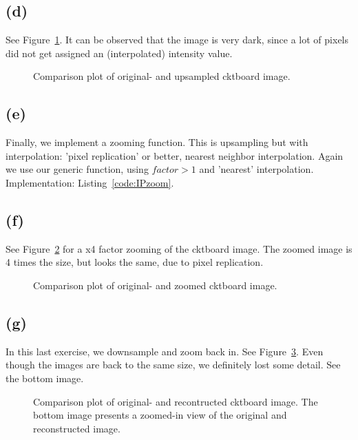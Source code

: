 \documentclass{article}
\begin{document}
\subsection*{(d)} See Figure~\ref{fig:upsampling}. It can be observed that the image is very dark, since a lot of pixels did not get assigned an (interpolated) intensity value.

\begin{figure}[ht]
    \centering
    
    \caption{Comparison plot of original- and upsampled cktboard image.}
    \label{fig:upsampling}
\end{figure}

\subsection*{(e)} Finally, we implement a zooming function. This is upsampling but with interpolation: 'pixel replication' or better, nearest neighbor interpolation. Again we use our generic function, using $factor > 1$ and 'nearest' interpolation.  Implementation: Listing~\ref{code:IPzoom}.

\subsection*{(f)} See Figure~\ref{fig:zoom} for a x4 factor zooming of the cktboard image. The zoomed image is 4 times the size, but looks the same, due to pixel replication.
\begin{figure}[ht]
    \centering
    
    \caption{Comparison plot of original- and zoomed cktboard image.}
    \label{fig:zoom}
\end{figure}

\subsection*{(g)} In this last exercise, we downsample and zoom back in. See Figure~\ref{fig:reconstruction}. Even though the images are back to the same size, we definitely lost some detail. See the bottom image.
\begin{figure}[ht]
    \centering
    
    
    \caption{Comparison plot of original- and recontructed cktboard image. The bottom image presents a zoomed-in view of the original and reconstructed image.}
    \label{fig:reconstruction}
\end{figure}
\end{document}
